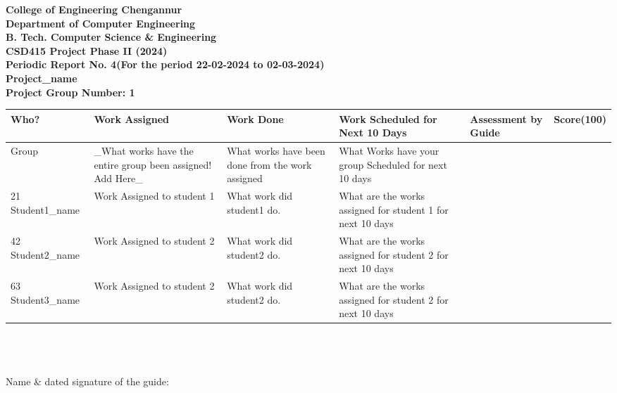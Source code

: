 \documentclass{article}
\begin{document}
\begin{center}
\textbf{
  College of Engineering Chengannur
\\Department of Computer Engineering
\\B. Tech. Computer Science \& Engineering
\\CSD415 Project Phase II (2024)
\\Periodic Report No. 4(For the period 22-02-2024 to 02-03-2024)
\\Project_name
\\Project Group Number: 1}
\end{center}

\begin{tabular}{|p{3cm}|p{3cm}|p{3cm}|p{3cm}|p{3cm}|p{1.5cm}|} 
\hline
Who? & Work Assigned & Work Done & Work Scheduled for Next 10 Days  &Assessment by Guide  & Score(100) \\
\hline 
Group     &_What works have the entire group been assigned! Add Here_ &What works have been done from the work assigned &What Works have your group Scheduled for next 10 days && \\ 
\hline 

21 Student1_name &Work Assigned to student 1&What work did student1 do. & What are the works assigned for student 1 for next 10 days&& \\ [10ex]
\hline 

42 Student2_name &Work Assigned to student 2&What work did student2 do. & What are the works assigned for student 2 for next 10 days&& \\ [10ex]
\hline 

63 Student3_name &Work Assigned to student 2&What work did student2 do. & What are the works assigned for student 2 for next 10 days&& \\ [10ex]
\hline 

\end{tabular}
\\
\\
\\ Name \& dated signature of the guide:\\\\
\end{document}
